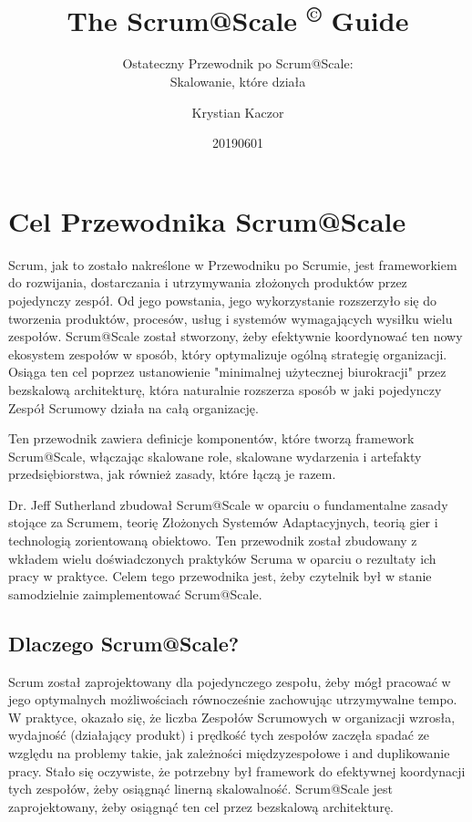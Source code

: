\documentclass[12pt,a4paper,parskip=full]{scrartcl}
\title{\Huge{\color{red}\textbf{The Scrum@Scale 
\textsuperscript{\copyright} 
Guide}}}
\subtitle{\color{gray}Ostateczny Przewodnik po Scrum@Scale:\\ Skalowanie, które działa}
\author{Krystian Kaczor}
\date{20190601}
\begin{document}

\section{Cel Przewodnika Scrum@Scale}

Scrum, jak to zostało nakreślone w Przewodniku po Scrumie, jest frameworkiem do rozwijania, dostarczania i utrzymywania złożonych produktów przez pojedynczy zespół. Od jego powstania, jego wykorzystanie rozszerzyło się do tworzenia produktów, procesów, usług i systemów wymagających wysiłku wielu zespołów. Scrum@Scale został stworzony, żeby efektywnie koordynować ten nowy ekosystem zespołów w sposób, który optymalizuje ogólną strategię organizacji. Osiąga ten cel poprzez ustanowienie "minimalnej użytecznej biurokracji" przez bezskalową architekturę, która naturalnie rozszerza sposób w jaki pojedynczy Zespół Scrumowy działa na całą organizację.

Ten przewodnik zawiera definicje komponentów, które tworzą framework Scrum@Scale, włączając skalowane role, skalowane wydarzenia i artefakty przedsiębiorstwa, jak również zasady, które łączą je razem.

Dr. Jeff Sutherland zbudował Scrum@Scale w oparciu o fundamentalne zasady stojące za Scrumem, teorię Złożonych Systemów Adaptacyjnych, teorią gier i technologią zorientowaną obiektowo. Ten przewodnik został zbudowany z wkładem wielu doświadczonych praktyków Scruma w oparciu o rezultaty ich pracy w praktyce. Celem tego przewodnika jest, żeby czytelnik był w stanie samodzielnie zaimplementować Scrum@Scale.

\subsection{Dlaczego Scrum@Scale?}

Scrum został zaprojektowany dla pojedynczego zespołu, żeby mógł pracować w jego optymalnych możliwościach równocześnie zachowując utrzymywalne tempo. W praktyce, okazało się, że liczba Zespołów Scrumowych w organizacji wzrosła, wydajność (działający produkt) i prędkość tych zespołów zaczęła spadać ze względu na problemy takie, jak zależności międzyzespołowe i and duplikowanie pracy. Stało się oczywiste, że potrzebny był framework do efektywnej koordynacji tych zespołów, żeby osiągnąć linerną skalowalność. Scrum@Scale jest zaprojektowany, żeby osiągnąć ten cel przez bezskalową architekturę.
\end{document}
